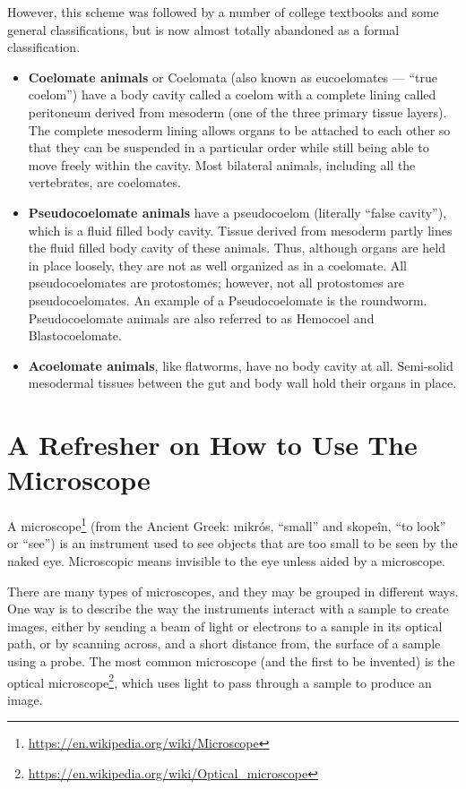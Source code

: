 \documentclass[]{book}
\let\rmarkdownfootnote\footnote%
\def\footnote{\protect\rmarkdownfootnote}
\renewcommand{\href}[2]{#2\footnote{\url{#1}}}
\begin{document}
However, this scheme was followed by a number of college textbooks and some general classifications, but is now almost totally abandoned as a formal classification.

\begin{itemize}
\item
  \textbf{Coelomate animals} or Coelomata (also known as eucoelomates --- ``true coelom'') have a body cavity called a coelom with a complete lining called peritoneum derived from mesoderm (one of the three primary tissue layers). The complete mesoderm lining allows organs to be attached to each other so that they can be suspended in a particular order while still being able to move freely within the cavity. Most bilateral animals, including all the vertebrates, are coelomates.
\item
  \textbf{Pseudocoelomate animals} have a pseudocoelom (literally ``false cavity''), which is a fluid filled body cavity. Tissue derived from mesoderm partly lines the fluid filled body cavity of these animals. Thus, although organs are held in place loosely, they are not as well organized as in a coelomate. All pseudocoelomates are protostomes; however, not all protostomes are pseudocoelomates. An example of a Pseudocoelomate is the roundworm. Pseudocoelomate animals are also referred to as Hemocoel and Blastocoelomate.
\item
  \textbf{Acoelomate animals}, like flatworms, have no body cavity at all. Semi-solid mesodermal tissues between the gut and body wall hold their organs in place.
\end{itemize}

\hypertarget{a-refresher-on-how-to-use-the-microscope}{%
\chapter{A Refresher on How to Use The Microscope}\label{a-refresher-on-how-to-use-the-microscope}}

A \href{https://en.wikipedia.org/wiki/Microscope}{microscope} (from the Ancient Greek: mikrós, ``small'' and skopeîn, ``to look'' or ``see'') is an instrument used to see objects that are too small to be seen by the naked eye. Microscopic means invisible to the eye unless aided by a microscope.

There are many types of microscopes, and they may be grouped in different ways. One way is to describe the way the instruments interact with a sample to create images, either by sending a beam of light or electrons to a sample in its optical path, or by scanning across, and a short distance from, the surface of a sample using a probe. The most common microscope (and the first to be invented) is the \href{https://en.wikipedia.org/wiki/Optical_microscope}{optical microscope}, which uses light to pass through a sample to produce an image.
\end{document}
